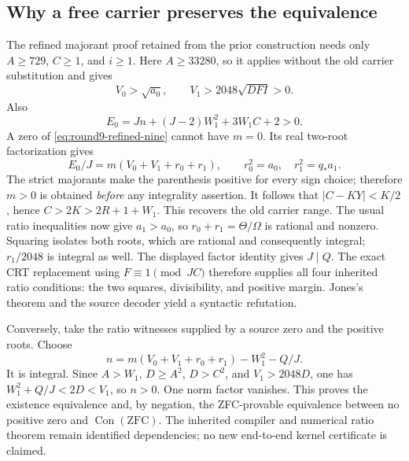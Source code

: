 \subsection{Why a free carrier preserves the equivalence}
The refined majorant proof retained from the prior construction needs only
$A\ge729$, $C\ge1$, and $i\ge1$.  Here $A\ge33280$, so it applies without
the old carrier substitution and gives
\[
 V_0>\sqrt{a_0},\qquad V_1>2048\sqrt{DFI}>0.
\]
Also
\[
 E_0=Jn+(J-2)W_1^2+3W_1C+2>0.
\]
A zero of \eqref{eq:round9-refined-nine} cannot have $m=0$.
Its real two-root factorization gives
\[
 E_0/J=m(V_0+V_1+r_0+r_1),\qquad
 r_0^2=a_0,\quad r_1^2=q_*a_1.
\]
The strict majorants make the parenthesis positive for every sign choice;
therefore $m>0$ is obtained \emph{before} any integrality assertion.
It follows that $|C-KY|<K/2$, hence $C>2K>2R+1+W_1$.
This recovers the old carrier range.  The usual ratio inequalities now give
$a_1>a_0$, so $r_0+r_1=\Theta/\Omega$ is rational and nonzero.
Squaring isolates both roots, which are rational and consequently integral;
$r_1/2048$ is integral as well.  The displayed factor identity gives $J\mid Q$.
The exact CRT replacement using $F\equiv1\pmod{JC}$ therefore supplies all
four inherited ratio conditions: the two squares, divisibility, and positive
margin.  Jones's theorem and the source decoder yield a syntactic refutation.

Conversely, take the ratio witnesses supplied by a source zero and the
positive roots.  Choose
\[
 n=m(V_0+V_1+r_0+r_1)-W_1^2-Q/J.
\]
It is integral.  Since $A>W_1$, $D\ge A^2$, $D>C^2$, and
$V_1>2048D$, one has $W_1^2+Q/J<2D<V_1$, so $n>0$.
One norm factor vanishes.  This proves the existence equivalence and,
by negation, the ZFC-provable equivalence between no positive zero and
$\operatorname{Con}(\mathrm{ZFC})$.  The inherited compiler and numerical
ratio theorem remain identified dependencies; no new end-to-end kernel
certificate is claimed.

